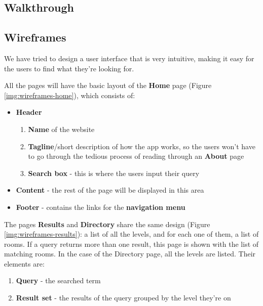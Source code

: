 \documentclass{sig-alt-release2}
\begin{document}
\subsection*{Walkthrough}

\subsection*{Wireframes}
We have tried to design a user interface that is very intuitive, making it
easy for the users to find what they're looking for.

All the pages will have the basic layout of the \textbf{Home} page
(Figure \ref{img:wireframes-home}), which consists of:
\begin{itemize} \itemsep1pt \parskip0pt 
	\item{
		\textbf{Header}
		\begin{enumerate} \itemsep1pt \parskip0pt 
			\item{
				\textbf{Name} of the website
			}
			\item{
				\textbf{Tagline}/short description of how the app works, so
				the users won't have to go through the tedious process of
				reading through an \textbf{About} page
			}
			\item{
				\textbf{Search box} - this is where the users input their
				query
			}
		\end{enumerate}
	}

	\item{
		\textbf{Content} - the rest of the page will be displayed in this area
	}
	
	\item{\textbf{Footer} - contains the links for the \textbf{navigation menu}
	}
\end{itemize}


The pages \textbf{Results} and \textbf{Directory} share the same design (Figure 
\ref{img:wireframes-results}): a list of all the levels, and for each one of 
them, a list of rooms. If a query returns more than one result, this page is 
shown with the list of matching rooms. In the case of the Directory page, all 
the levels are listed. Their elements are:
\begin{enumerate} \itemsep1pt \parskip0pt 
	\item{\textbf{Query} - the searched term}
	\item{\textbf{Result set} - the results of the query grouped by the level
	they're on}
\end{enumerate}
\end{document}
